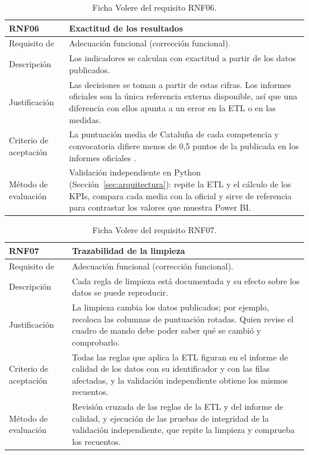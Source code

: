 \documentclass[12pt, a4paper, oneside]{report}
\begin{document}
\begin{table}[!htbp]
\centering
\small
{}\renewcommand{\arraystretch}{1.0}\setlength{\defaultaddspace}{3pt}
\begin{tabularx}{\textwidth}{@{} >{\raggedright\arraybackslash}p{3.4cm} X @{}}
\toprule
\textbf{RNF06} & \textbf{Exactitud de los resultados} \\ \midrule
Requisito de & Adecuación funcional (corrección funcional). \\ \addlinespace
Descripción & Los indicadores se calculan con exactitud a partir de los datos publicados. \\ \addlinespace
Justificación & Las decisiones se toman a partir de estas cifras. Los informes oficiales son la única referencia externa disponible, así que una diferencia con ellos apunta a un error en la ETL o en las medidas. \\ \addlinespace
Criterio de aceptación & La puntuación media de Cataluña de cada competencia y convocatoria difiere menos de 0,5 puntos de la publicada en los informes oficiales \cite{csase_resultats}. \\ \addlinespace
Método de evaluación & Validación independiente en Python (Sección~\ref{sec:arquitectura}): repite la ETL y el cálculo de los KPIs, compara cada media con la oficial y sirve de referencia para contrastar los valores que muestra Power BI. \\ \bottomrule
\end{tabularx}
\caption{Ficha Volere del requisito RNF06.}
\label{tab:rnf06}
\end{table}

\begin{table}[!htbp]
\centering
\small
{}\renewcommand{\arraystretch}{1.0}\setlength{\defaultaddspace}{3pt}
\begin{tabularx}{\textwidth}{@{} >{\raggedright\arraybackslash}p{3.4cm} X @{}}
\toprule
\textbf{RNF07} & \textbf{Trazabilidad de la limpieza} \\ \midrule
Requisito de & Adecuación funcional (corrección funcional). \\ \addlinespace
Descripción & Cada regla de limpieza está documentada y su efecto sobre los datos se puede reproducir. \\ \addlinespace
Justificación & La limpieza cambia los datos publicados; por ejemplo, recoloca las columnas de puntuación rotadas. Quien revise el cuadro de mando debe poder saber qué se cambió y comprobarlo. \\ \addlinespace
Criterio de aceptación & Todas las reglas que aplica la ETL figuran en el informe de calidad de los datos con su identificador y con las filas afectadas, y la validación independiente obtiene los mismos recuentos. \\ \addlinespace
Método de evaluación & Revisión cruzada de las reglas de la ETL y del informe de calidad, y ejecución de las pruebas de integridad de la validación independiente, que repite la limpieza y comprueba los recuentos. \\ \bottomrule
\end{tabularx}
\caption{Ficha Volere del requisito RNF07.}
\label{tab:rnf07}
\end{table}
\end{document}

